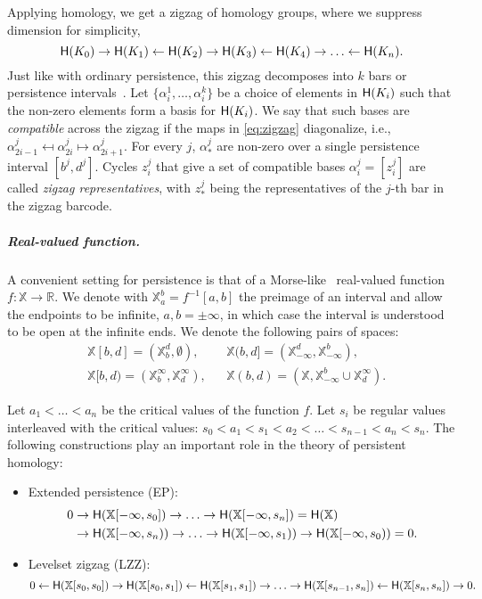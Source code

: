 \documentclass[cleveref,a4paper,english,nolineno]{socg-lipics-v2021}
\newcommand{\mapsot}{\mapsfrom}
\newcommand{\Rsp}{\mathbb{R}}
\newcommand{\Xsp}{\mathbb{X}}
\newcommand{\ot}{\leftarrow}
\renewcommand{\paragraph}[1]{\subparagraph*{#1}}
\newcommand{\Hgr}{{\sf H}}
\begin{document}
Applying homology, we get a zigzag of homology groups, where we suppress
dimension for simplicity,
\begin{equation}
    \label{eq:zigzag}
    \Hgr(K_0) \to \Hgr(K_1) \ot \Hgr(K_2) \to \Hgr(K_3) \ot \Hgr(K_4) \to \ldots \ot \Hgr(K_n).
\end{equation}
Just like with ordinary persistence, this zigzag decomposes into $k$ bars
or persistence intervals~\cite{CdS10}.
Let $\{ \alpha^1_i, \ldots, \alpha^k_i \}$ be a choice of elements in $\Hgr(K_i)$
such that the non-zero elements form a basis for $\Hgr(K_i)$. We say that
such bases are \emph{compatible} across the zigzag if the maps in \cref{eq:zigzag} diagonalize, i.e.,
$\alpha^j_{2i-1} \mapsot \alpha^j_{2i} \mapsto \alpha^j_{2i+1}$. For every $j$,
$\alpha^j_*$ are non-zero over a single persistence interval $[b^j,d^j]$.
Cycles $z_i^j$ that give a set of compatible bases
$\alpha_i^j = [z_i^j]$ are called \emph{zigzag representatives}, with $z_*^j$
being the representatives of the $j$-th bar in the zigzag barcode.



    


\paragraph{Real-valued function.}
A convenient setting for persistence is that of a Morse-like~\cite{CdSKM19} real-valued
function $f: \Xsp \to \Rsp$.
We denote with $\Xsp_a^b = f^{-1}[a,b]$ the preimage of an interval and allow
the endpoints to be infinite, $a,b = \pm\infty$, in which case the
interval is understood to be open at the infinite ends. We denote the following pairs of spaces:
\begin{align*}
    & \Xsp[b,d] = (\Xsp_b^d, \emptyset),
   && \Xsp(b,d] = (\Xsp_{-\infty}^d, \Xsp_{-\infty}^b), \\
    & \Xsp[b,d) = (\Xsp_b^{\infty}, \Xsp_d^{\infty}),
   && \Xsp(b,d) = (\Xsp, \Xsp_{-\infty}^b \cup \Xsp_d^{\infty}).
\end{align*}

Let $a_1 < \ldots < a_n$ be the critical values of the function $f$.
Let $s_i$ be regular values interleaved with the critical values: $s_0 < a_1 <
s_1 < a_2 < \ldots < s_{n-1} < a_n < s_n$.
The following constructions play an important role in the
theory of persistent homology:
\begin{itemize}[leftmargin=*]
    \item
        Extended persistence (EP):
        \begin{align*}
            0& \to \Hgr(\Xsp[-\infty, s_0]) \to \ldots \to \Hgr(\Xsp[-\infty,
            s_n]) = \Hgr(\Xsp) \\
             & \to \Hgr(\Xsp[-\infty, s_n)) \to \ldots \to \Hgr(\Xsp[-\infty, s_1))
               \to \Hgr(\Xsp[-\infty, s_0)) = 0.
        \end{align*}
    \item
        Levelset zigzag (LZZ):
        \[
            0 \ot \Hgr(\Xsp[s_0, s_0]) \to \Hgr(\Xsp[s_0, s_1]) \ot
            \Hgr(\Xsp[s_1,s_1]) \to \ldots \to \Hgr(\Xsp[s_{n-1}, s_n]) \ot
            \Hgr(\Xsp[s_n,s_n]) \to 0.
        \]
\end{itemize}
\end{document}
